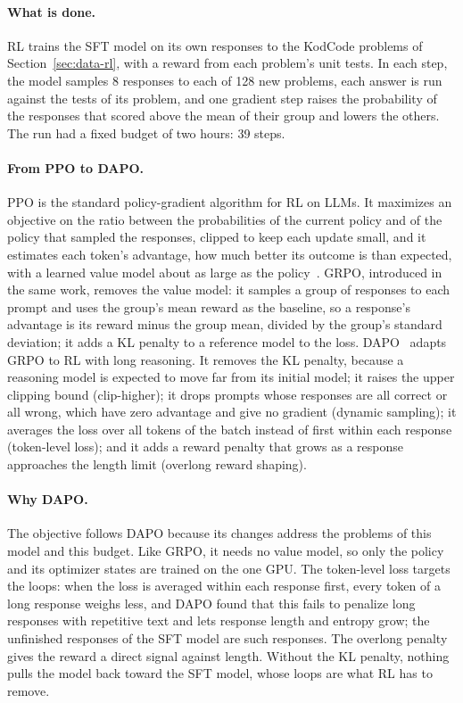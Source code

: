 \documentclass[sigconf,nonacm,balance=false]{acmart}
\begin{document}
\paragraph{What is done.} RL trains the SFT model on its own responses to the KodCode problems of
Section~\ref{sec:data-rl}, with a reward from each problem's unit tests. In each step, the model samples 8 responses
to each of 128 new problems, each answer is run against the tests of its problem, and one gradient step raises the
probability of the responses that scored above the mean of their group and lowers the others. The run had a fixed
budget of two hours: 39 steps.

\paragraph{From PPO to DAPO\@.} PPO is the standard policy-gradient algorithm for RL on LLMs. It maximizes an
objective on the ratio between the probabilities of the current policy and of the policy that sampled the responses,
clipped to keep each update small, and it estimates each token's advantage, how much better its outcome is than
expected, with a learned value model about as large as the policy~\cite{shao2024deepseekmath}. GRPO, introduced in
the same work, removes the value model: it samples a group of
responses to each prompt and uses the group's mean reward as the baseline, so a response's advantage is its reward
minus the group mean, divided by the group's standard deviation; it adds a KL penalty to a reference model to the
loss. DAPO~\cite{yu2025dapo} adapts GRPO to RL with long reasoning. It removes the KL penalty, because a reasoning
model is expected to move far from its initial model; it raises the upper clipping bound (clip-higher); it drops
prompts whose responses are all correct or all wrong, which have zero advantage and give no gradient (dynamic
sampling); it averages the loss over all tokens of the batch instead of first within each response (token-level
loss); and it adds a reward penalty that grows as a response approaches the length limit (overlong reward shaping).

\paragraph{Why DAPO\@.} The objective follows DAPO because its changes address the problems of this model and this
budget. Like GRPO, it needs no value model, so only the policy and its optimizer states are trained on the one GPU.
The token-level loss targets the loops: when the loss is averaged within each response first, every token of a long
response weighs less, and DAPO found that this fails to penalize long responses with repetitive text and lets
response length and entropy grow; the unfinished responses of the SFT model are such responses. The overlong penalty
gives the reward a direct signal against length. Without the KL penalty, nothing pulls the model back toward the SFT
model, whose loops are what RL has to remove.
\end{document}
